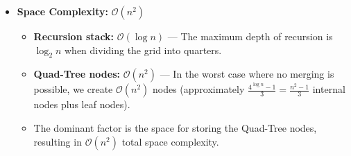 \begin{itemize}
    \item \textbf{Space Complexity:} $\mathcal{O}(n^2)$
    \begin{itemize}
        \item \textbf{Recursion stack:} $\mathcal{O}(\log n)$ — The maximum depth of recursion is $\log_2 n$ when dividing the grid into quarters.
        \item \textbf{Quad-Tree nodes:} $\mathcal{O}(n^2)$ — In the worst case where no merging is possible, we create $\mathcal{O}(n^2)$ nodes (approximately $\frac{4^{\log n} - 1}{3} = \frac{n^2 - 1}{3}$ internal nodes plus leaf nodes).
        \item The dominant factor is the space for storing the Quad-Tree nodes, resulting in $\mathcal{O}(n^2)$ total space complexity.
    \end{itemize}
\end{itemize}

\clearpage